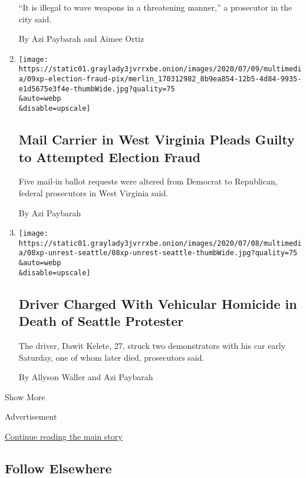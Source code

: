 \begin{enumerate}
  ``It is illegal to wave weapons in a threatening manner,'' a
  prosecutor in the city said.

  By Azi Paybarah and Aimee Ortiz
\item
  \href{/2020/07/09/us/politics/west-Virginia-election-fraud.html}{}

  \texttt{[image: https://static01.graylady3jvrrxbe.onion/images/2020/07/09/multimedia/09xp-election-fraud-pix/merlin\_170312982\_8b9ea854-12b5-4d84-9935-e1d5675e3f4e-thumbWide.jpg?quality=75\\\&auto=webp\\\&disable=upscale]}

  \hypertarget{mail-carrier-in-west-virginia-pleads-guilty-to-attempted-election-fraud}{%
  \subsection{Mail Carrier in West Virginia Pleads Guilty to Attempted
  Election
  Fraud}\label{mail-carrier-in-west-virginia-pleads-guilty-to-attempted-election-fraud}}

  Five mail-in ballot requests were altered from Democrat to Republican,
  federal prosecutors in West Virginia said.

  By Azi Paybarah
\item
  \href{/2020/07/08/us/dawit-kelete-seattle-protest-driver-charges.html}{}

  \texttt{[image: https://static01.graylady3jvrrxbe.onion/images/2020/07/08/multimedia/08xp-unrest-seattle/08xp-unrest-seattle-thumbWide.jpg?quality=75\\\&auto=webp\\\&disable=upscale]}

  \hypertarget{driver-charged-with-vehicular-homicide-in-death-of-seattle-protester}{%
  \subsection{Driver Charged With Vehicular Homicide in Death of Seattle
  Protester}\label{driver-charged-with-vehicular-homicide-in-death-of-seattle-protester}}

  The driver, Dawit Kelete, 27, struck two demonstrators with his car
  early Saturday, one of whom later died, prosecutors said.

  By Allyson Waller and Azi Paybarah
\end{enumerate}

Show More

Advertisement

\protect\hyperlink{after-mid2}{Continue reading the main story}

\hypertarget{follow-elsewhere}{%
\subsection{Follow Elsewhere}\label{follow-elsewhere}}

